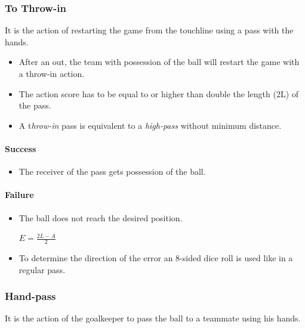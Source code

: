 \documentclass[12pt]{article}
\begin{document}
\subsubsection{To Throw-in}
It is the action of restarting the game from the touchline using a pass with the hands.

\begin{rulebox}
\begin{itemize}
\item After an out, the team with possession of the ball will restart the game with a throw-in action.
\item The action score has to be equal to or higher than double the length (2L) of the pass.
\item A t\emph{hrow-in} pass is equivalent to a \emph{high-pass} without minimum distance.
\end{itemize}
\end{rulebox}

\paragraph{Success}

\begin{rulebox}
\begin{itemize}
\item The receiver of the pass gets possession of the ball.
\end{itemize}
\end{rulebox}

\paragraph{Failure}

\begin{rulebox}
\begin{itemize}
\item The ball does not reach the desired position.
\begin{formulabox}
$E = \frac{2L - A}{2}$
\end{formulabox}
\item To determine the direction of the error an 8-sided dice roll is used like in a regular pass.
\end{itemize}
\end{rulebox}

\subsubsection{Hand-pass}
It is the action of the goalkeeper to pass the ball to a teammate using his hands.
\end{document}
